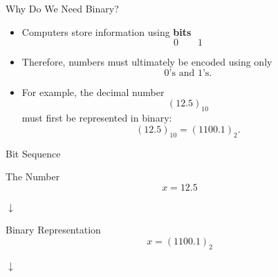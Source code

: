\documentclass[10pt]{beamer}
\begin{document}
\begin{frame}{Why Do We Need Binary?}

\begin{itemize}
    \item Computers store information using \textbf{bits}
    \[
        \boxed{0}\qquad \boxed{1}
    \]

    \item Therefore, numbers must ultimately be encoded using only
    \[
        0\text{'s and }1\text{'s}.
    \]

    \vfill

    \item For example, the decimal number
    \[
        (12.5)_{10}
    \]
    must first be represented in binary:
    \[
        (12.5)_{10} = (1100.1)_2.
    \]

\end{itemize}


\end{frame}
\begin{frame}{Bit Sequence}

{}
\begin{block}{The Number}
    $$x  = 12.5$$
\end{block}

\vspace{-4mm}
\begin{center} 
$\downarrow$
\end{center}\vspace{-4mm}

\begin{block}{Binary Representation}
    $$x  = (1100.1)_2$$
\end{block}

\vspace{-4mm}
\begin{center} 
$\downarrow$
\end{center}\vspace{-4mm}

\end{frame}
\end{document}

